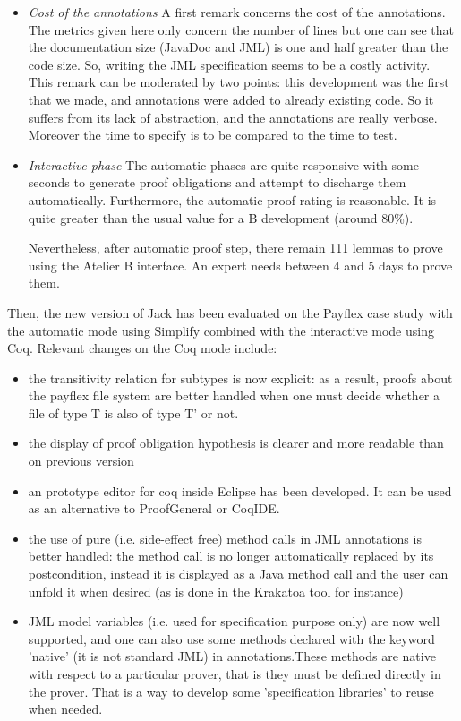\begin{itemize}
\item \emph{Cost of the annotations}
A first remark concerns the cost of the annotations.  The metrics
given here only concern the number of lines but one can see that the
documentation size (JavaDoc and JML) is one and half greater than the
code size.  So, writing the JML specification seems to be a costly
activity.  This remark can be moderated by two points: this
development was the first that we made, and annotations were added to
already existing code. So it suffers from its lack of abstraction, and
the annotations are really verbose. Moreover the time to specify is to
be compared to the time to test.

\item \emph{Interactive phase}
The automatic phases are quite responsive with some seconds to
generate proof obligations and attempt to discharge them
automatically.  Furthermore, the automatic proof rating is reasonable.
It is quite greater than the usual value for a B development (around
80\%).

Nevertheless, after automatic proof step, there remain 111 lemmas to
prove using the Atelier B interface.  An expert needs between 4 and 5
days to prove them.
\end{itemize}
Then, the new version of Jack has been evaluated on the Payflex case
study with the automatic mode using Simplify combined with the
interactive mode using Coq. Relevant changes on the Coq mode include:
\begin{itemize}
\item the transitivity relation for subtypes is now explicit:
      as a result, proofs about the payflex file system are better handled
      when one must decide whether a file of type T is also of type T' 
or not.
  
\item  the display of proof obligation hypothesis is clearer and more 
readable than on previous version

  
\item an prototype editor for coq inside Eclipse has been
  developed. It can be used as an alternative to ProofGeneral or
  CoqIDE.

  
\item the use of pure (i.e. side-effect free) method calls in JML
  annotations is better handled: the method call is no longer
  automatically replaced by its postcondition, instead it is displayed
  as a Java method call and the user can unfold it when desired (as is
  done in the Krakatoa tool for instance)
  
\item JML model variables (i.e. used for specification purpose only)
  are now well supported, and one can also use some methods declared
  with the keyword 'native' (it is not standard JML) in
  annotations.These methods are native with respect to a particular
  prover, that is they must be defined directly in the prover. That is
  a way to develop some 'specification libraries' to reuse when
  needed.
\end{itemize}
